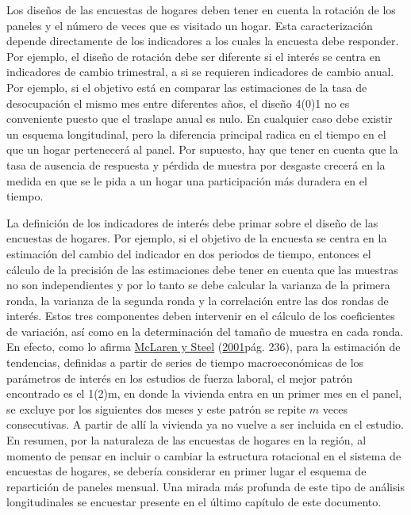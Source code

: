 \documentclass[
  12pt,
  spanish,
]{book}
\begin{document}
Los diseños de las encuestas de hogares deben tener en cuenta la rotación de los paneles y el número de veces que es visitado un hogar. Esta caracterización depende directamente de los indicadores a los cuales la encuesta debe responder. Por ejemplo, el diseño de rotación debe ser diferente si el interés se centra en indicadores de cambio trimestral, a si se requieren indicadores de cambio anual. Por ejemplo, si el objetivo está en comparar las estimaciones de la tasa de desocupación el mismo mes entre diferentes años, el diseño 4(0)1 no es conveniente puesto que el traslape anual es nulo. En cualquier caso debe existir un esquema longitudinal, pero la diferencia principal radica en el tiempo en el que un hogar pertenecerá al panel. Por supuesto, hay que tener en cuenta que la tasa de ausencia de respuesta y pérdida de muestra por desgaste crecerá en la medida en que se le pida a un hogar una participación más duradera en el tiempo.

La definición de los indicadores de interés debe primar sobre el diseño de las encuestas de hogares. Por ejemplo, si el objetivo de la encuesta se centra en la estimación del cambio del indicador en dos periodos de tiempo, entonces el cálculo de la precisión de las estimaciones debe tener en cuenta que las muestras no son independientes y por lo tanto se debe calcular la varianza de la primera ronda, la varianza de la segunda ronda y la correlación entre las dos rondas de interés. Estos tres componentes deben intervenir en el cálculo de los coeficientes de variación, así como en la determinación del tamaño de muestra en cada ronda. En efecto, como lo afirma \protect\hyperlink{ref-McLaren_Steel_2001}{McLaren y Steel} (\protect\hyperlink{ref-McLaren_Steel_2001}{2001}pág. 236), para la estimación de tendencias, definidas a partir de series de tiempo macroeconómicas de los parámetros de interés en los estudios de fuerza laboral, el mejor patrón encontrado es el 1(2)m, en donde la vivienda entra en un primer mes en el panel, se excluye por los siguientes dos meses y este patrón se repite \(m\) veces consecutivas. A partir de allí la vivienda ya no vuelve a ser incluida en el estudio. En resumen, por la naturaleza de las encuestas de hogares en la región, al momento de pensar en incluir o cambiar la estructura rotacional en el sistema de encuestas de hogares, se debería considerar en primer lugar el esquema de repartición de paneles mensual. Una mirada más profunda de este tipo de análisis longitudinales se encuestar presente en el último capítulo de este documento.
\end{document}
